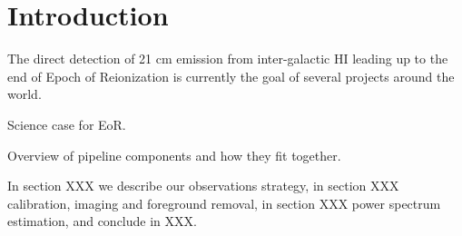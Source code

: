 \section{Introduction} 
The direct detection of 21 cm emission from inter-galactic HI leading up to the end of Epoch of Reionization is currently the goal of several projects around the world. 

Science case for EoR.

Overview of pipeline components and how they fit together.

In section XXX we describe our observations strategy, in section XXX calibration, imaging and foreground removal, in section XXX power spectrum estimation, and conclude in XXX.